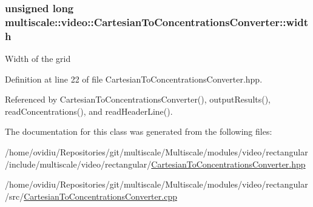 \hypertarget{classmultiscale_1_1video_1_1CartesianToConcentrationsConverter_ae6fba5af405d884c7b70ed206a6d5cb1}{
\subsubsection[{width}]{\setlength{\rightskip}{0pt plus 5cm}unsigned long multiscale\-::video\-::\-Cartesian\-To\-Concentrations\-Converter\-::width\hspace{0.3cm}{\ttfamily [private]}}}\label{classmultiscale_1_1video_1_1CartesianToConcentrationsConverter_ae6fba5af405d884c7b70ed206a6d5cb1}
Width of the grid 

Definition at line 22 of file Cartesian\-To\-Concentrations\-Converter.\-hpp.



Referenced by Cartesian\-To\-Concentrations\-Converter(), output\-Results(), read\-Concentrations(), and read\-Header\-Line().



The documentation for this class was generated from the following files\-:\begin{DoxyCompactItemize}
\item 
/home/ovidiu/\-Repositories/git/multiscale/\-Multiscale/modules/video/rectangular/include/multiscale/video/rectangular/\hyperlink{CartesianToConcentrationsConverter_8hpp}{Cartesian\-To\-Concentrations\-Converter.\-hpp}\item 
/home/ovidiu/\-Repositories/git/multiscale/\-Multiscale/modules/video/rectangular/src/\hyperlink{CartesianToConcentrationsConverter_8cpp}{Cartesian\-To\-Concentrations\-Converter.\-cpp}\end{DoxyCompactItemize}
